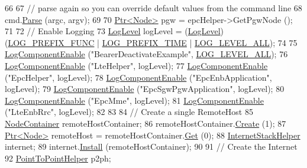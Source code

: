 \begin{DoxyCode}
66 
67   \textcolor{comment}{// parse again so you can override default values from the command line}
68   cmd.\hyperlink{classns3_1_1CommandLine_a5c10b85b3207e5ecb48d907966923156}{Parse} (argc, argv);
69 
70   \hyperlink{classns3_1_1Ptr}{Ptr<Node>} pgw = epcHelper->GetPgwNode ();
71 
72   \textcolor{comment}{// Enable Logging}
73   \hyperlink{namespacens3_aa6464a4d69551a9cc968e17a65f39bdb}{LogLevel} logLevel = (\hyperlink{namespacens3_aa6464a4d69551a9cc968e17a65f39bdb}{LogLevel})(\hyperlink{namespacens3_aa6464a4d69551a9cc968e17a65f39bdba0dd332264f60317e9a365095e80037d1}{LOG\_PREFIX\_FUNC} | 
      \hyperlink{namespacens3_aa6464a4d69551a9cc968e17a65f39bdba2b78ce26a040614a34c7d71db83024b9}{LOG\_PREFIX\_TIME} | \hyperlink{namespacens3_aa6464a4d69551a9cc968e17a65f39bdba022b1237a4fd1b08d034471df3c58586}{LOG\_LEVEL\_ALL});
74 
75   \hyperlink{namespacens3_adc4ef4f00bb2f5f4edae67fc3bc27f20}{LogComponentEnable} (\textcolor{stringliteral}{"BearerDeactivateExample"}, \hyperlink{namespacens3_aa6464a4d69551a9cc968e17a65f39bdba022b1237a4fd1b08d034471df3c58586}{LOG\_LEVEL\_ALL});
76   \hyperlink{namespacens3_adc4ef4f00bb2f5f4edae67fc3bc27f20}{LogComponentEnable} (\textcolor{stringliteral}{"LteHelper"}, logLevel);
77   \hyperlink{namespacens3_adc4ef4f00bb2f5f4edae67fc3bc27f20}{LogComponentEnable} (\textcolor{stringliteral}{"EpcHelper"}, logLevel);
78   \hyperlink{namespacens3_adc4ef4f00bb2f5f4edae67fc3bc27f20}{LogComponentEnable} (\textcolor{stringliteral}{"EpcEnbApplication"}, logLevel);
79   \hyperlink{namespacens3_adc4ef4f00bb2f5f4edae67fc3bc27f20}{LogComponentEnable} (\textcolor{stringliteral}{"EpcSgwPgwApplication"}, logLevel);
80   \hyperlink{namespacens3_adc4ef4f00bb2f5f4edae67fc3bc27f20}{LogComponentEnable} (\textcolor{stringliteral}{"EpcMme"}, logLevel);
81   \hyperlink{namespacens3_adc4ef4f00bb2f5f4edae67fc3bc27f20}{LogComponentEnable} (\textcolor{stringliteral}{"LteEnbRrc"}, logLevel);
82 
83 
84   \textcolor{comment}{// Create a single RemoteHost}
85   \hyperlink{classns3_1_1NodeContainer}{NodeContainer} remoteHostContainer;
86   remoteHostContainer.\hyperlink{classns3_1_1NodeContainer_a787f059e2813e8b951cc6914d11dfe69}{Create} (1);
87   \hyperlink{classns3_1_1Ptr}{Ptr<Node>} remoteHost = remoteHostContainer.\hyperlink{classns3_1_1NodeContainer_a9ed96e2ecc22e0f5a3d4842eb9bf90bf}{Get} (0);
88   \hyperlink{classns3_1_1InternetStackHelper}{InternetStackHelper} internet;
89   internet.\hyperlink{classns3_1_1InternetStackHelper_a6645b412f31283d2d9bc3d8a95cebbc0}{Install} (remoteHostContainer);
90 
91   \textcolor{comment}{// Create the Internet}
92   \hyperlink{classns3_1_1PointToPointHelper}{PointToPointHelper} p2ph;

\end{DoxyCode}
